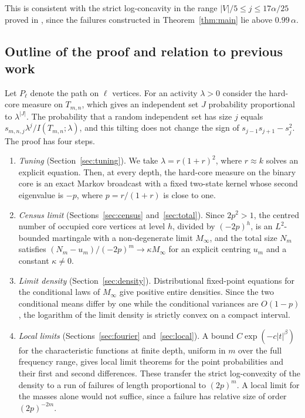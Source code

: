 \documentclass{amsart}
\theoremstyle{definition}
\theoremstyle{remark}
\numberwithin{equation}{section}
\newcommand{\abs}[1]{\lvert #1\rvert}
\begin{document}
This is consistent with the strict log-concavity in the range $\abs{V}/5\le j\le 17\alpha/25$ proved in \cite[Theorem~1.2]{FLNYZ26}, since the failures constructed in Theorem~\ref{thm:main} lie above $0.99\,\alpha$.

\subsection{Outline of the proof and relation to previous work}

Let $P_\ell$ denote the path on $\ell$ vertices. For an activity $\lambda>0$ consider the hard-core measure on $T_{m,n}$, which gives an independent set $J$ probability proportional to $\lambda^{\abs{J}}$. The probability that a random independent set has size $j$ equals $s_{m,n,j}\lambda^j/I(T_{m,n};\lambda)$, and this tilting does not change the sign of $s_{j-1}s_{j+1}-s_j^2$. The proof has four steps.

\begin{enumerate}[label=(\arabic*),leftmargin=*]
\item \emph{Tuning} (Section~\ref{sec:tuning}). We take $\lambda=r(1+r)^2$, where $r\approx k$ solves an explicit equation. Then, at every depth, the hard-core measure on the binary core is an exact Markov broadcast with a fixed two-state kernel whose second eigenvalue is $-p$, where $p=r/(1+r)$ is close to one.
\item \emph{Census limit} (Sections~\ref{sec:census} and~\ref{sec:total}). Since $2p^2>1$, the centred number of occupied core vertices at level $h$, divided by $(-2p)^h$, is an $L^2$-bounded martingale with a non-degenerate limit $M_\infty$, and the total size $N_m$ satisfies $(N_m-u_m)/(-2p)^m\to\kappa M_\infty$ for an explicit centring $u_m$ and a constant $\kappa\neq0$.
\item \emph{Limit density} (Section~\ref{sec:density}). Distributional fixed-point equations for the conditional laws of $M_\infty$ give positive entire densities. Since the two conditional means differ by one while the conditional variances are $O(1-p)$, the logarithm of the limit density is strictly convex on a compact interval.
\item \emph{Local limits} (Sections~\ref{sec:fourier} and~\ref{sec:local}). A bound $C\exp(-c\abs{t}^\beta)$ for the characteristic functions at finite depth, uniform in $m$ over the full frequency range, gives local limit theorems for the point probabilities and their first and second differences. These transfer the strict log-convexity of the density to a run of failures of length proportional to $(2p)^m$. A local limit for the masses alone would not suffice, since a failure has relative size of order $(2p)^{-2m}$.
\end{enumerate}
\end{document}
